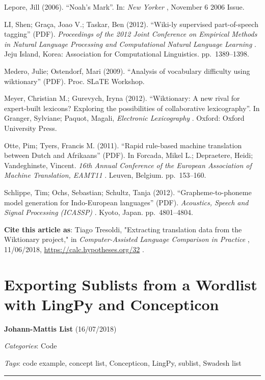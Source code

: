 \documentclass[
  english,
  a4paper,
  oneside,tablecaptionabove
]{scrbook}
\begin{document}
Lepore, Jill (2006). \enquote{Noah's Mark}. In: \emph{New Yorker} ,
November 6 2006 Issue.

LI, Shen; Graça, Joao V.; Taskar, Ben (2012). \enquote{Wiki-ly
supervised part-of-speech tagging} (PDF). \emph{Proceedings of the 2012
Joint Conference on Empirical Methods in Natural Language Processing and
Computational Natural Language Learning} . Jeju Island, Korea:
Association for Computational Linguistics. pp.~1389--1398.

Medero, Julie; Ostendorf, Mari (2009). \enquote{Analysis of vocabulary
difficulty using wiktionary} (PDF). Proc. SLaTE Workshop.

Meyer, Christian M.; Gurevych, Iryna (2012). \enquote{Wiktionary: A new
rival for expert-built lexicons? Exploring the possibilities of
collaborative lexicography}. In Granger, Sylviane; Paquot, Magali,
\emph{Electronic Lexicography} . Oxford: Oxford University Press.

Otte, Pim; Tyers, Francis M. (2011). \enquote{Rapid rule-based machine
translation between Dutch and Afrikaans} (PDF). In Forcada, Mikel L.;
Depraetere, Heidi; Vandeghinste, Vincent. \emph{16th Annual Conference
of the European Association of Machine Translation, EAMT11} . Leuven,
Belgium. pp.~153--160.

Schlippe, Tim; Ochs, Sebastian; Schultz, Tanja (2012).
\enquote{Grapheme-to-phoneme model generation for Indo-European
languages} (PDF). \emph{Acoustics, Speech and Signal Processing
(ICASSP)} . Kyoto, Japan. pp.~4801--4804.

\textbf{Cite this article as}: Tiago Tresoldi, "Extracting translation
data from the Wiktionary project," in \emph{Computer-Assisted Language
Comparison in Practice} , 11/06/2018,
\url{https://calc.hypotheses.org/32} .

\hypertarget{exporting-sublists-from-a-wordlist-with-lingpy-and-concepticon}{%
\chapter{Exporting Sublists from a Wordlist with LingPy and
Concepticon}\label{exporting-sublists-from-a-wordlist-with-lingpy-and-concepticon}}

\textbf{Johann-Mattis List} (16/07/2018)

\emph{Categories}: Code

\emph{Tags}: code example, concept list, Concepticon, LingPy, sublist,
Swadesh list

\begin{center}\rule{0.5\linewidth}{\linethickness}\end{center}
\end{document}
